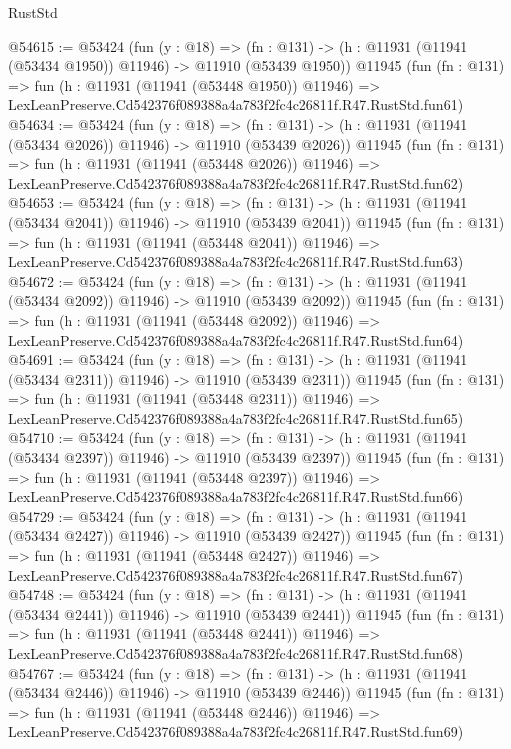 \begin{lexlean}{RustStd}
\begin{coremodule}
@54615 := @53424
    (fun (y : @18) =>
    (fn : @131) -> (h : @11931 (@11941 (@53434 @1950)) @11946) -> @11910 (@53439 @1950))
    @11945
    (fun (fn : @131) =>
    fun (h : @11931 (@11941 (@53448 @1950)) @11946) =>
    LexLeanPreserve.Cd542376f089388a4a783f2fc4c26811f.R47.RustStd.fun61)
@54634 := @53424
    (fun (y : @18) =>
    (fn : @131) -> (h : @11931 (@11941 (@53434 @2026)) @11946) -> @11910 (@53439 @2026))
    @11945
    (fun (fn : @131) =>
    fun (h : @11931 (@11941 (@53448 @2026)) @11946) =>
    LexLeanPreserve.Cd542376f089388a4a783f2fc4c26811f.R47.RustStd.fun62)
@54653 := @53424
    (fun (y : @18) =>
    (fn : @131) -> (h : @11931 (@11941 (@53434 @2041)) @11946) -> @11910 (@53439 @2041))
    @11945
    (fun (fn : @131) =>
    fun (h : @11931 (@11941 (@53448 @2041)) @11946) =>
    LexLeanPreserve.Cd542376f089388a4a783f2fc4c26811f.R47.RustStd.fun63)
@54672 := @53424
    (fun (y : @18) =>
    (fn : @131) -> (h : @11931 (@11941 (@53434 @2092)) @11946) -> @11910 (@53439 @2092))
    @11945
    (fun (fn : @131) =>
    fun (h : @11931 (@11941 (@53448 @2092)) @11946) =>
    LexLeanPreserve.Cd542376f089388a4a783f2fc4c26811f.R47.RustStd.fun64)
@54691 := @53424
    (fun (y : @18) =>
    (fn : @131) -> (h : @11931 (@11941 (@53434 @2311)) @11946) -> @11910 (@53439 @2311))
    @11945
    (fun (fn : @131) =>
    fun (h : @11931 (@11941 (@53448 @2311)) @11946) =>
    LexLeanPreserve.Cd542376f089388a4a783f2fc4c26811f.R47.RustStd.fun65)
@54710 := @53424
    (fun (y : @18) =>
    (fn : @131) -> (h : @11931 (@11941 (@53434 @2397)) @11946) -> @11910 (@53439 @2397))
    @11945
    (fun (fn : @131) =>
    fun (h : @11931 (@11941 (@53448 @2397)) @11946) =>
    LexLeanPreserve.Cd542376f089388a4a783f2fc4c26811f.R47.RustStd.fun66)
@54729 := @53424
    (fun (y : @18) =>
    (fn : @131) -> (h : @11931 (@11941 (@53434 @2427)) @11946) -> @11910 (@53439 @2427))
    @11945
    (fun (fn : @131) =>
    fun (h : @11931 (@11941 (@53448 @2427)) @11946) =>
    LexLeanPreserve.Cd542376f089388a4a783f2fc4c26811f.R47.RustStd.fun67)
@54748 := @53424
    (fun (y : @18) =>
    (fn : @131) -> (h : @11931 (@11941 (@53434 @2441)) @11946) -> @11910 (@53439 @2441))
    @11945
    (fun (fn : @131) =>
    fun (h : @11931 (@11941 (@53448 @2441)) @11946) =>
    LexLeanPreserve.Cd542376f089388a4a783f2fc4c26811f.R47.RustStd.fun68)
@54767 := @53424
    (fun (y : @18) =>
    (fn : @131) -> (h : @11931 (@11941 (@53434 @2446)) @11946) -> @11910 (@53439 @2446))
    @11945
    (fun (fn : @131) =>
    fun (h : @11931 (@11941 (@53448 @2446)) @11946) =>
    LexLeanPreserve.Cd542376f089388a4a783f2fc4c26811f.R47.RustStd.fun69)

\end{coremodule}
\end{lexlean}
